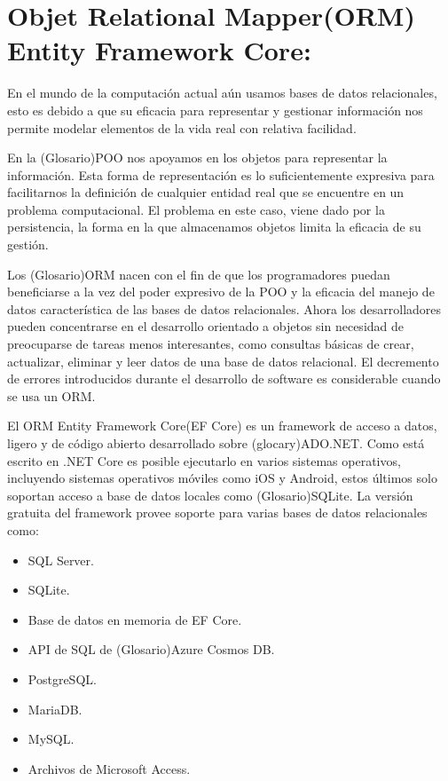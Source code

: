 \section{Objet Relational Mapper(ORM) Entity Framework Core:}

En el mundo de la computación actual aún usamos bases de datos relacionales, esto es debido a que su eficacia para representar y gestionar información nos permite modelar elementos de la vida real con relativa facilidad.

En la (Glosario)POO nos apoyamos en los objetos para representar la información. Esta forma de representación es lo suficientemente expresiva para facilitarnos la definición de cualquier entidad real que se encuentre en un problema computacional. El problema en este caso, viene dado por la persistencia, la forma en la que almacenamos objetos limita la eficacia de su gestión.
\newline

Los (Glosario)ORM nacen con el fin de que los programadores puedan beneficiarse a la vez del poder expresivo de la POO y la eficacia del manejo de datos característica de las bases de datos relacionales. Ahora los desarrolladores pueden concentrarse en el desarrollo orientado a objetos sin necesidad de preocuparse de tareas menos interesantes, como consultas básicas de crear, actualizar, eliminar y leer datos de una base de datos relacional. El decremento de errores  introducidos durante el desarrollo de software es considerable cuando se usa un ORM.
\newline

El ORM Entity Framework Core(EF Core) es un framework de acceso a datos, ligero y de código abierto desarrollado sobre (glocary)ADO.NET. Como está escrito en .NET Core es posible ejecutarlo en varios sistemas operativos, incluyendo sistemas operativos móviles como iOS y Android, estos últimos solo soportan acceso a base de datos locales como (Glosario)SQLite. La versión gratuita del framework provee soporte para varias bases de datos relacionales como:


\begin{itemize}
	\item SQL Server.
    \item SQLite.
    \item Base de datos en memoria de EF Core.
    \item API de SQL de (Glosario)Azure Cosmos DB.
    \item PostgreSQL.
    \item MariaDB.
    \item MySQL.
    \item Archivos de Microsoft Access.
    
\end{itemize}

